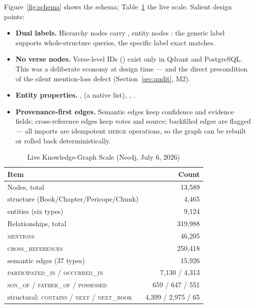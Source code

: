 Figure~\ref{fig:schema} shows the schema; Table~\ref{tab:kgscale} the live
scale. Salient design points:

\begin{itemize}
\item \textbf{Dual labels.} Hierarchy nodes carry
, entity nodes : the
generic label supports whole-structure queries, the specific label exact
matches.
\item \textbf{No verse nodes.} Verse-level IDs () exist
only in Qdrant and PostgreSQL. This was a deliberate economy at design
time --- and the direct precondition of the silent mention-loss defect
(Section~\ref{sec:audit}, M2).
\item \textbf{Entity properties.} ,
 (a native list), , .
\item \textbf{Provenance-first edges.} Semantic edges keep confidence and
evidence fields; cross-reference edges keep votes and source; backfilled edges
are flagged --- all imports are idempotent \textsc{merge} operations, so
the graph can be rebuilt or rolled back deterministically.
\end{itemize}

\begin{table}[!t]
\caption{Live Knowledge-Graph Scale (Neo4j, July 6, 2026)}
\label{tab:kgscale}
\centering
\begin{tabular}{lr}
\toprule
Item & Count \\
\midrule
Nodes, total & 13{,}589 \\
\quad structure (Book/Chapter/Pericope/Chunk) & 4{,}465 \\
\quad entities (six types) & 9{,}124 \\
Relationships, total & 319{,}988 \\
\quad \textsc{mentions} & 46{,}205 \\
\quad \textsc{cross\_references} & 250{,}418 \\
\quad semantic edges (37 types) & 15{,}926 \\
\qquad \textsc{participated\_in} / \textsc{occurred\_in} & 7{,}130 / 4{,}313 \\
\qquad \textsc{son\_of} / \textsc{father\_of} / \textsc{possessed} & 659 / 647 / 551 \\
\quad structural: \textsc{contains} / \textsc{next} / \textsc{next\_book} & 4{,}399 / 2{,}975 / 65 \\
\bottomrule
\end{tabular}
\end{table}


